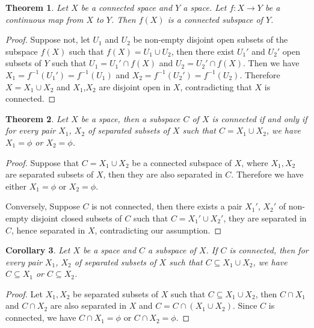 \documentclass[12pt,oneside,english]{amsbook}
\numberwithin{equation}{section} %
\numberwithin{figure}{section} %
\theoremstyle{plain}
\numberwithin{section}{chapter}
\newtheorem{thm}{Theorem}[section]
\theoremstyle{plain}
\newtheorem{corollary}[thm]{Corollary}
\begin{document}
\begin{thm}\label{connectedness:4}
  Let $X$ be a connected space and $Y$ a space. Let $f:  X \to Y$ be a continuous map from $X$ to $Y$. Then $f(X)$ is a connected subspace of $Y$.
\end{thm}
\begin{proof}
  Suppose not, let $U_1$ and $U_2$ be non-empty disjoint open subsets of the subspace $f(X)$ such that $f(X) = U_1 \cup U_2$, then there exist $U_1'$ and $U_2'$ open subsets of $Y$ such that $U_1 = U_1' \cap f(X)$ and $U_2 = U_2' \cap f(X)$. Then we have $X_1 = f^{-1}(U_1') = f^{-1}(U_1)$ and  $X_2 = f^{-1}(U_2') = f^{-1}(U_2)$. Therefore $X = X_1 \cup X_2$ and $X_1$,$X_2$ are disjoint open in $X$, contradicting that $X$ is connected.
\end{proof}

\begin{thm}\label{connectedness:5}
  Let $X$ be a space, then a subspace $C$ of $X$ is connected if and only if for every pair $X_1$, $X_2$ of separated subsets of $X$ such that $C = X_1 \cup X_2$, we have $X_1 = \phi$ or $X_2 = \phi$.
\end{thm}
\begin{proof}
  Suppose that $C = X_1 \cup X_2$ be a connected subspace of $X$, where $X_1,X_2$ are separated subsets of $X$, then they are also separated in $C$. Therefore we have either $X_1 = \phi$ or $X_2 = \phi$.

  Conversely, Suppose $C$ is not connected, then there exists a pair $X_1'$, $X_2'$ of non-empty disjoint closed subsets of $C$ such that $C = X_1' \cup X_2'$, they are separated in $C$, hence separated in $X$, contradicting our assumption.
\end{proof}

\begin{corollary}\label{connectedness:6}
  Let $X$ be a space and $C$ a subspace of $X$. If $C$ is connected, then for every pair $X_1$, $X_2$ of separated subsets of $X$ such that $C \subseteq X_1 \cup X_2$, we have $C \subseteq X_1$ or $C \subseteq X_2$.
\end{corollary}
\begin{proof}
  Let $X_1,X_2$ be separated subsets of $X$ such that $C \subseteq X_1 \cup X_2$, then $C \cap X_1$ and $C \cap X_2$ are also separated in $X$ and $C = C \cap (X_1 \cup X_2)$. Since $C$ is connected,  we have $C \cap X_1 = \phi$ or $C \cap X_2 = \phi$.
\end{proof}
\end{document}
